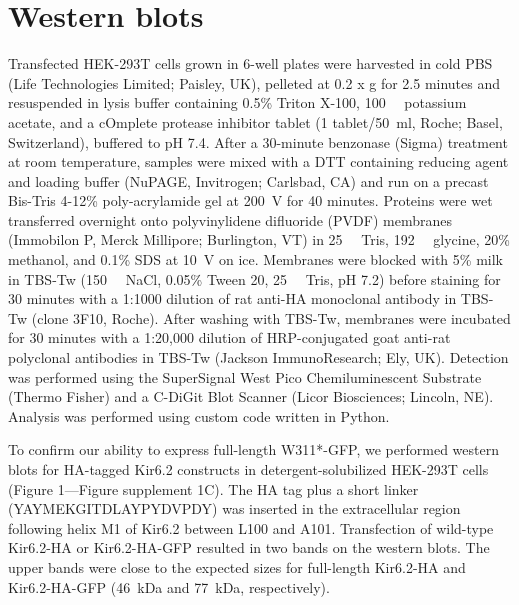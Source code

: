 \section{Western blots}
Transfected HEK-293T cells grown in 6-well plates were harvested in cold PBS (Life Technologies Limited; Paisley, UK), pelleted at 0.2 x g for 2.5 minutes and resuspended in lysis buffer containing 0.5\% Triton X-100, \SI{100}{\milli\Molar} potassium acetate, and a cOmplete protease inhibitor tablet (1 tablet/\SI{50}{\milli\litre}, Roche; Basel, Switzerland), buffered to pH 7.4.
After a 30-minute benzonase (Sigma) treatment at room temperature, samples were mixed with a DTT containing reducing agent and loading buffer (NuPAGE, Invitrogen; Carlsbad, CA) and run on a precast Bis-Tris 4-12\% poly-acrylamide gel at \SI{200}{\volt} for 40 minutes.
Proteins were wet transferred overnight onto polyvinylidene difluoride (PVDF) membranes (Immobilon P, Merck Millipore; Burlington, VT) in \SI{25}{\milli\Molar} Tris, \SI{192}{\milli\Molar} glycine, 20\% methanol, and 0.1\% SDS at \SI{10}{\volt} on ice.
Membranes were blocked with 5\% milk in TBS-Tw (\SI{150}{\milli\Molar} NaCl, 0.05\% Tween 20, \SI{25}{\milli\Molar} Tris, pH 7.2) before staining for 30 minutes with a 1:1000 dilution of rat anti-HA monoclonal antibody in TBS-Tw (clone 3F10, Roche).
After washing with TBS-Tw, membranes were incubated for 30 minutes with a 1:20,000 dilution of HRP-conjugated goat anti-rat polyclonal antibodies in TBS-Tw (Jackson ImmunoResearch; Ely, UK).
Detection was performed using the SuperSignal West Pico Chemiluminescent Substrate (Thermo Fisher) and a C-DiGit Blot Scanner (Licor Biosciences; Lincoln, NE).
Analysis was performed using custom code written in Python.

To confirm our ability to express full-length W311*-GFP, we performed western blots for HA-tagged Kir6.2 constructs in detergent-solubilized HEK-293T cells (Figure 1—Figure supplement 1C).
The HA tag plus a short linker (YAYMEKGITDLAYPYDVPDY) was inserted in the extracellular region following helix M1 of Kir6.2 between L100 and A101.
Transfection of wild-type Kir6.2-HA or Kir6.2-HA-GFP resulted in two bands on the western blots.
The upper bands were close to the expected sizes for full-length Kir6.2-HA and Kir6.2-HA-GFP (\SI{46}{\kilo\dalton} and \SI{77}{\kilo\dalton}, respectively).

